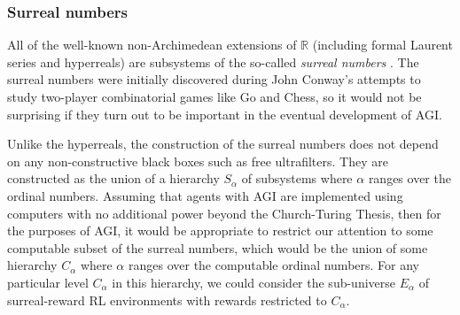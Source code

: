 \documentclass[reqno]{article}
\theoremstyle{definition}
\begin{document}
\subsubsection{Surreal numbers}

All of the
well-known non-Archimedean extensions of $\mathbb R$
(including formal Laurent series and hyperreals) are subsystems of the
so-called \emph{surreal numbers}
\cite{conway} \cite{knuth} \cite{ehrlich2012absolute}. The surreal
numbers were initially discovered during John Conway's attempts to study
two-player combinatorial games like Go and Chess, so it would not be
surprising if they turn out to be important in the eventual development of
AGI.


Unlike the hyperreals,
the construction of the surreal numbers does not depend on any
non-constructive black boxes such as free ultrafilters.
They are constructed as the union of a hierarchy $S_\alpha$ of subsystems where
$\alpha$ ranges over the ordinal numbers. Assuming that agents with AGI are
implemented using computers with no additional power beyond the Church-Turing
Thesis, then for the purposes of AGI, it would be appropriate to restrict our
attention to some computable subset of the surreal numbers, which would be the union of
some hierarchy $C_\alpha$ where $\alpha$ ranges over the computable ordinal numbers.
For any particular level $C_\alpha$ in this hierarchy, we could consider the
sub-universe $E_\alpha$ of surreal-reward RL environments with rewards restricted
to $C_\alpha$.
\end{document}
